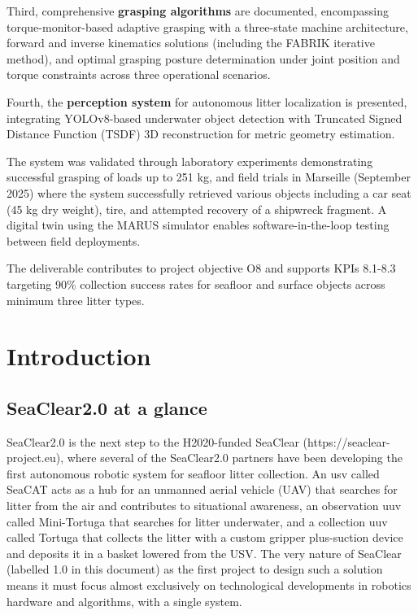 \documentclass[a4paper,11pt]{article}
\let\oldsection\section
\renewcommand\section{\clearpage\oldsection}
\begin{document}
Third, comprehensive \textbf{grasping algorithms} are documented, encompassing torque-monitor-based adaptive grasping with a three-state machine architecture, forward and inverse kinematics solutions (including the FABRIK iterative method), and optimal grasping posture determination under joint position and torque constraints across three operational scenarios.

Fourth, the \textbf{perception system} for autonomous litter localization is presented, integrating YOLOv8-based underwater object detection with Truncated Signed Distance Function (TSDF) 3D reconstruction for metric geometry estimation.

The system was validated through laboratory experiments demonstrating successful grasping of loads up to 251 kg, and field trials in Marseille (September 2025) where the system successfully retrieved various objects including a car seat (45 kg dry weight), tire, and attempted recovery of a shipwreck fragment. A digital twin using the MARUS simulator enables software-in-the-loop testing between field deployments.

The deliverable contributes to project objective O8 and supports KPIs 8.1-8.3 targeting 90\% collection success rates for seafloor and surface objects across minimum three litter types.
\section{Introduction}

\subsection{SeaClear2.0 at a glance}


SeaClear2.0 is the next step to the H2020-funded SeaClear (https://seaclear-project.eu), where several of the SeaClear2.0 partners have been developing the first autonomous robotic system for seafloor litter collection. An \gls{usv} called SeaCAT acts as a hub for an unmanned aerial vehicle (UAV) that searches for litter from the air and contributes to situational awareness, an observation \gls{uuv} called Mini-Tortuga that searches for litter underwater, and a collection \gls{uuv} called Tortuga that collects the litter with a custom gripper plus-suction device and deposits it in a basket lowered from the USV. The very nature of SeaClear (labelled 1.0 in this document) as the first project to design such a solution means it must focus almost exclusively on technological developments in robotics hardware and algorithms, with a single system.
\end{document}
